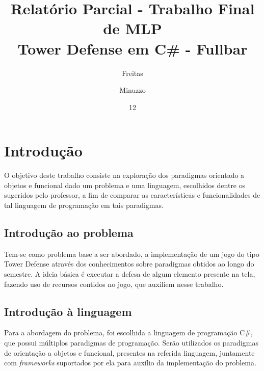 \documentclass[rel_mlp]{iiufrgs}
\title{%
  Relatório Parcial - Trabalho Final de MLP \\
  \large Tower Defense em C\# - Fullbar}
\author{Freitas}{Pietra} %
\author{Minuzzo}{Thayná} %
\date{12}{2017}
\begin{document}
\maketitle      



\tableofcontents






%
\chapter{Introdução} \label{intro}

O objetivo deste trabalho consiste na exploração dos paradigmas orientado a objetos e funcional dado um problema e uma linguagem, escolhidos dentre os sugeridos pelo professor, a fim de comparar as características e funcionalidades de tal linguagem de programação em tais paradigmas. 

\section{Introdução ao problema}

Tem-se como problema base a ser abordado, a implementação de um jogo do tipo Tower Defense através dos conhecimentos sobre paradigmas obtidos ao longo do semestre. A ideia básica é executar a defesa de algum elemento presente na tela, fazendo uso de recursos contidos no jogo, que auxiliem nesse trabalho.  

\section{Introdução à linguagem}

Para a abordagem do problema, foi escolhida a linguagem de programação C\#, que possui múltiplos paradigmas de programação. Serão utilizados os paradigmas de orientação a objetos e funcional, presentes na referida linguagem, juntamente com \textit{frameworks} suportados por ela para auxílio da implementação do problema.
\end{document}
